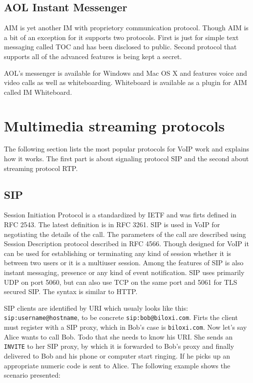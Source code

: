 \subsection*{AOL Instant Messenger}
AIM is yet another IM with proprietory communication protocol. Though AIM is a bit of an exception for it supports two protocols. First is just for simple text messaging called TOC and has been disclosed to public. Second protocol that supports all of the advanced features is being kept a secret.

AOL's messenger is available for Windows and Mac OS X and features voice and video calls as well as whiteboarding. Whiteboard is available as a plugin for AIM called IM Whiteboard. 

\section{Multimedia streaming protocols}
The following section lists the most popular protocols for VoIP work and explains how it works. The first part is about signaling protocol SIP and the second about streaming protocol RTP.

\subsection*{SIP}
Session Initiation Protocol is a standardized by IETF and was firts defined in RFC 2543. The latest definition is in RFC 3261. SIP is used in VoIP for negotiating the details of the call. The parameters of the call are described using Session Description protocol described in RFC 4566. Though designed for VoIP it can be used for establishing or terminating any kind of session whether it is between two users or it is a multiuser session. Among the features of SIP is also instant messaging, presence or any kind of event notification. SIP uses primarily UDP on port 5060, but can also use TCP on the same port and 5061 for TLS secured SIP. The syntax is similar to HTTP.

SIP clients are identified by URI which usualy looks like this: \verb|sip:username@hostname|, to be concrete \verb|sip:bob@biloxi.com|. Firts the client must register with a SIP proxy, which in Bob's case is \verb|biloxi.com|. Now let's say Alice wants to call Bob. Todo that she needs to know his URI. She sends an \verb|INVITE| to her SIP proxy, by which it is forwarded to Bob's proxy and finally delivered to Bob and his phone or computer start ringing. If he picks up an appropriate numeric code is sent to Alice. The following example\cite{SIPRFC} shows the scenario presented:    

